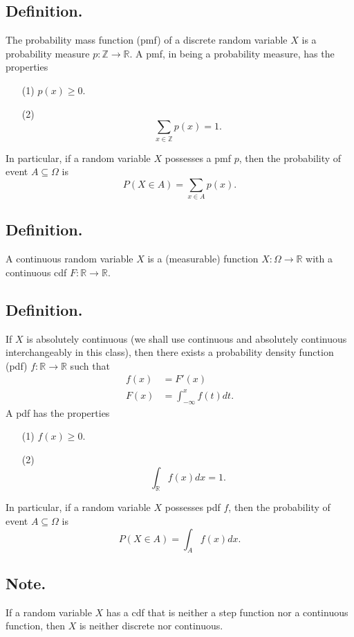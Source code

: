 \documentclass[titlepage]{article}
\begin{document}
\subsection{Definition.} The probability mass function (pmf) of a discrete random variable $X$ is a probability measure $p: \mathbb{Z} \to \mathbb{R}$. A pmf, in being a probability measure, has the properties 
\begin{enumerate}
\item[(1)] $p(x) \geq 0$.
\item[(2)]
$$\sum_{x \in \mathbb{Z}}p(x) = 1.$$
\end{enumerate}
In particular, if a random variable $X$ possesses a pmf $p$, then the probability of event $A \subseteq \Omega$ is
$$P(X \in A) = \sum_{x \in A}p(x).$$

\subsection{Definition.} A continuous random variable $X$ is a (measurable) function $X: \Omega \to \mathbb{R}$ with a continuous cdf $F: \mathbb{R} \to \mathbb{R}$.

\subsection{Definition.} If $X$ is absolutely continuous (we shall use continuous and absolutely continuous interchangeably in this class), then there exists a probability density function (pdf) $f: \mathbb{R} \to \mathbb{R}$ such that 
\begin{align*}
    f(x) &= F'(x) \\
    F(x) &= \int_{-\infty}^{x}f(t)dt.
\end{align*}
A pdf has the properties 
\begin{enumerate}
\item[(1)] $f(x) \geq 0$.
\item[(2)] 
$$\int_{\mathbb{R}}f(x)dx = 1.$$
\end{enumerate}
In particular, if a random variable $X$ possesses pdf $f$, then the probability of event $A \subseteq \Omega$ is 
$$P(X \in A) = \int_{A}f(x)dx.$$

\subsection{Note.} If a random variable $X$ has a cdf that is neither a step function nor a continuous function, then $X$ is neither discrete nor continuous.
\end{document}
